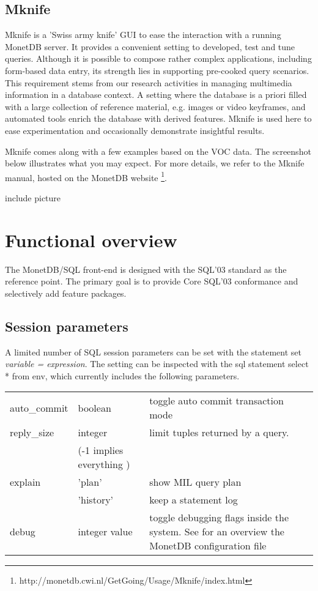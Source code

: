 \documentclass[10pt,twocolumn,fleqn]{article}
\begin{document}
\subsection{Mknife}
\label{mknife}
Mknife is a 'Swiss army knife' GUI to ease the interaction with a running 
MonetDB server. It provides a convenient setting to developed, test and 
tune queries. Although it is possible to compose rather complex applications,
including form-based data entry, its strength lies in supporting pre-cooked 
query scenarios. This requirement stems from our research activities in managing 
multimedia information in a database context. A setting where the database 
is a priori filled with a large collection of reference material, 
e.g. images or video keyframes, and automated tools enrich the database 
with derived features. Mknife is used here to ease experimentation and 
occasionally demonstrate insightful results.

Mknife comes along with a few examples based on the VOC
data. The screenshot below illustrates what you may expect.
For more details, we refer to the Mknife manual, hosted on
the
MonetDB website \footnote{http://monetdb.cwi.nl/GetGoing/Usage/Mknife/index.html}.
\begin{fig}
include picture
\end{fig}


\section{Functional overview}
\label{Functionality}
The MonetDB/SQL front-end is designed with the SQL'03 standard as the reference
point. The primary goal is to provide Core SQL'03 conformance and
selectively add feature packages.

\subsection*{Session parameters}
A limited number of SQL session parameters can be set with the
statement {\sc set} {\em variable = expression}.
The setting can be inspected with the {\sc sql} statement
{\sc select} * {\sc from} env, which currently includes
the following parameters.
\begin{tabular}{ll l}
auto\_commit & boolean & toggle auto commit transaction mode\\
reply\_size & integer & limit tuples returned by a query.\\
	& (-1 implies everything )\\
explain & 'plan' & show MIL query plan\\
	& 'history' & keep a statement log \\
debug & integer value & toggle debugging flags inside the system. 
See for an overview the MonetDB configuration file\\
\end{tabular}
\end{document}
